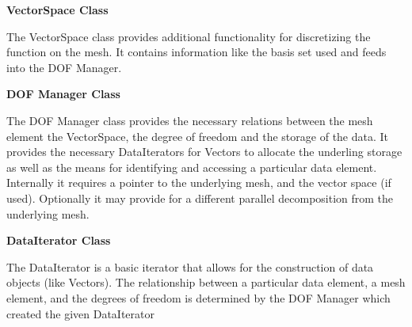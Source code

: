 \documentclass[10pt]{article}
\begin{document}
\vspace{6 mm}\noindent\textbf{VectorSpace Class}

The VectorSpace class provides additional functionality for discretizing the function on the mesh.  It contains information like the basis set used and feeds into the DOF Manager.



\vspace{6 mm}\noindent\textbf{DOF Manager Class}

The DOF Manager class provides the necessary relations between the mesh element the VectorSpace, the degree of freedom and the storage of the data.  It provides the necessary DataIterators for Vectors to allocate the underling storage as well as the means for identifying and accessing a particular data element.  Internally it requires a pointer to the underlying mesh, and the vector space (if used).  Optionally it may provide for a different parallel decomposition from the underlying mesh.



\vspace{6 mm}\noindent\textbf{DataIterator Class}

The DataIterator is a basic iterator that allows for the construction of data objects (like Vectors).  The relationship between a particular data element, a mesh element, and the degrees of freedom is determined by the DOF Manager which created the given DataIterator
\end{document}
